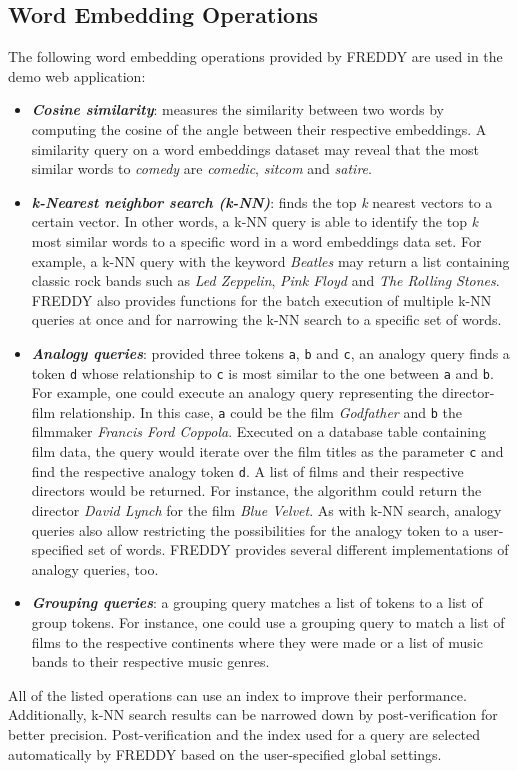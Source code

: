 \subsection{Word Embedding Operations}
The following word embedding operations provided by FREDDY are used in the demo web application:
\begin{itemize}
	\item \textit{\textbf{Cosine similarity}}: measures the similarity between two words by computing the cosine of the angle between their respective embeddings. A similarity query on a word embeddings dataset may reveal that the most similar words to \textit{comedy} are \textit{comedic}, \textit{sitcom} and \textit{satire}. 
	\item \textit{\textbf{k-Nearest neighbor search (k-NN)}}: finds the top \textit{k} nearest vectors to a certain vector. In other words, a k-NN query is able to identify the top \textit{k} most similar words to a specific word in a word embeddings data set. For example, a k-NN query with the keyword \textit{Beatles} may return a list containing classic rock bands such as \textit{Led Zeppelin}, \textit{Pink Floyd} and \textit{The Rolling Stones}. FREDDY also provides functions for the batch execution of multiple k-NN queries at once and for narrowing the k-NN search to a specific set of words.
	\item \textit{\textbf{Analogy queries}}: provided three tokens \texttt{a}, \texttt{b} and \texttt{c}, an analogy query finds a token \texttt{d} whose relationship to \texttt{c} is most similar to the one between \texttt{a} and \texttt{b}. For example, one could execute an analogy query representing the director-film relationship. In this case, \texttt{a} could be the film \textit{Godfather} and \texttt{b} the filmmaker \textit{Francis Ford Coppola}. Executed on a database table containing film data, the query would iterate over the film titles as the parameter \texttt{c} and find the respective analogy token \texttt{d}. A list of films and their respective directors would be returned. For instance, the algorithm could return the director \textit{David Lynch} for the film \textit{Blue Velvet}. As with k-NN search, analogy queries also allow restricting the possibilities for the analogy token to a user-specified set of words. FREDDY provides several different implementations of analogy queries, too.
	\item \textit{\textbf{Grouping queries}}: a grouping query matches a list of tokens to a list of group tokens. For instance, one could use a grouping query to match a list of films to the respective continents where they were made or a list of music bands to their respective music genres. 
\end{itemize}

All of the listed operations can use an index to improve their performance. Additionally, k-NN search results can be narrowed down by post-verification for better precision. Post-verification and the index used for a query are selected automatically by FREDDY based on the user-specified global settings.
